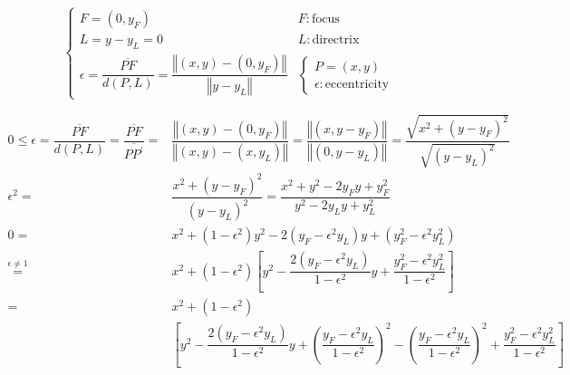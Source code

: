 \documentclass[
]{book}
\theoremstyle{definition}
\theoremstyle{definition}
\theoremstyle{definition}
\theoremstyle{definition}
\theoremstyle{remark}
\begin{document}
\[
\begin{cases}
F=\left(0,y_{{\scriptscriptstyle F}}\right) & F:\text{focus}\\
L=y-y_{{\scriptscriptstyle L}}=0 & L:\text{directrix}\\
\epsilon=\dfrac{\overline{PF}}{d\left(P,L\right)}=\dfrac{\left\Vert \left(x,y\right)-\left(0,y_{{\scriptscriptstyle F}}\right)\right\Vert }{\left\Vert y-y_{{\scriptscriptstyle L}}\right\Vert } & \begin{cases}
P=\left(x,y\right)\\
\epsilon:\text{eccentricity}
\end{cases}
\end{cases}
\]

\begin{align}
0\le\epsilon=\dfrac{\overline{PF}}{d\left(P,L\right)}=\dfrac{\overline{PF}}{\overline{PP^{\prime}}}= & \dfrac{\left\Vert \left(x,y\right)-\left(0,y_{{\scriptscriptstyle F}}\right)\right\Vert }{\left\Vert \left(x,y\right)-\left(x,y_{{\scriptscriptstyle L}}\right)\right\Vert }=\dfrac{\left\Vert \left(x,y-y_{{\scriptscriptstyle F}}\right)\right\Vert }{\left\Vert \left(0,y-y_{{\scriptscriptstyle L}}\right)\right\Vert }=\dfrac{\sqrt{x^{2}+\left(y-y_{{\scriptscriptstyle F}}\right)^{2}}}{\sqrt{\left(y-y_{{\scriptscriptstyle L}}\right)^{2}}} \label{eq:eccentricity}\\
\epsilon^{2}= & \dfrac{x^{2}+\left(y-y_{{\scriptscriptstyle F}}\right)^{2}}{\left(y-y_{{\scriptscriptstyle L}}\right)^{2}}=\dfrac{x^{2}+y^{2}-2y_{{\scriptscriptstyle F}}y+y_{{\scriptscriptstyle F}}^{2}}{y^{2}-2y_{{\scriptscriptstyle L}}y+y_{{\scriptscriptstyle L}}^{2}}\\
0= & x^{2}+\left(1-\epsilon^{2}\right)y^{2}-2\left(y_{{\scriptscriptstyle F}}-\epsilon^{2}y_{{\scriptscriptstyle L}}\right)y+\left(y_{{\scriptscriptstyle F}}^{2}-\epsilon^{2}y_{{\scriptscriptstyle L}}^{2}\right)\\
\overset{\epsilon\ne1}{=} & x^{2}+\left(1-\epsilon^{2}\right)\left[y^{2}-\dfrac{2\left(y_{{\scriptscriptstyle F}}-\epsilon^{2}y_{{\scriptscriptstyle L}}\right)}{1-\epsilon^{2}}y+\dfrac{y_{{\scriptscriptstyle F}}^{2}-\epsilon^{2}y_{{\scriptscriptstyle L}}^{2}}{1-\epsilon^{2}}\right]\\
= & x^{2}+\left(1-\epsilon^{2}\right)\\
 & \left[y^{2}-\dfrac{2\left(y_{{\scriptscriptstyle F}}-\epsilon^{2}y_{{\scriptscriptstyle L}}\right)}{1-\epsilon^{2}}y+\left(\dfrac{y_{{\scriptscriptstyle F}}-\epsilon^{2}y_{{\scriptscriptstyle L}}}{1-\epsilon^{2}}\right)^{2}-\left(\dfrac{y_{{\scriptscriptstyle F}}-\epsilon^{2}y_{{\scriptscriptstyle L}}}{1-\epsilon^{2}}\right)^{2}+\dfrac{y_{{\scriptscriptstyle F}}^{2}-\epsilon^{2}y_{{\scriptscriptstyle L}}^{2}}{1-\epsilon^{2}}\right]\\

\end{align}
\end{document}
